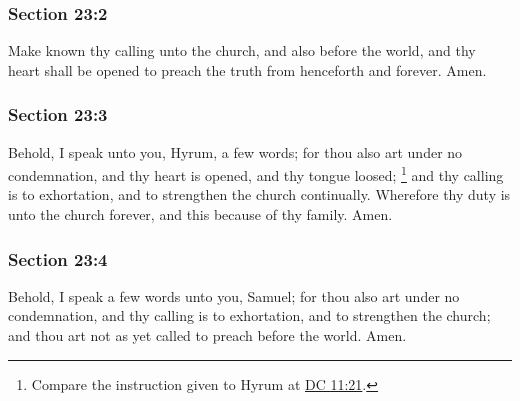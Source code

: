 	\subsubsection{Section 23:2} %
		\label{DC23-2}

		Make known thy calling unto the church, and also before the world, and thy heart shall be opened to preach the truth from henceforth and forever. Amen.


	\subsubsection{Section 23:3} %
		\label{DC23-3}

		Behold, I speak unto you, Hyrum, a few words; for thou also art under no condemnation, and thy heart is opened, and thy tongue loosed;%
			\footnote{%
				Compare the instruction given to Hyrum at \hyperref[DC11-21]{DC 11:21}.
				}
		and thy calling is to exhortation, and to strengthen the church continually. Wherefore thy duty is unto the church forever, and this because of thy family. Amen.


	\subsubsection{Section 23:4} %
		\label{DC23-4}

		Behold, I speak a few words unto you, Samuel; for thou also art under no condemnation, and thy calling is to exhortation, and to strengthen the church; and thou art not as yet called to preach before the world. Amen.

